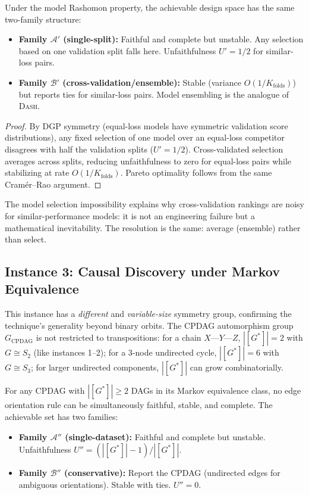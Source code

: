 \documentclass{jmlr}
\newcommand{\DASH}{\textsc{Dash}}
\begin{document}
\begin{theorem}
\label{thm:model-selection-ds}
Under the model Rashomon property, the achievable design space has the same two-family structure:
\begin{itemize}
    \item \textbf{Family $\mathcal{A}'$ (single-split):} Faithful and complete but unstable. Any selection based on one validation split falls here. Unfaithfulness $U' = 1/2$ for similar-loss pairs.
    \item \textbf{Family $\mathcal{B}'$ (cross-validation/ensemble):} Stable (variance $O(1/K_{\text{folds}})$) but reports ties for similar-loss pairs. Model ensembling is the analogue of \DASH{}.
\end{itemize}
\end{theorem}

\begin{proof}
By DGP symmetry (equal-loss models have symmetric validation score distributions), any fixed selection of one model over an equal-loss competitor disagrees with half the validation splits ($U' = 1/2$). Cross-validated selection averages across splits, reducing unfaithfulness to zero for equal-loss pairs while stabilizing at rate $O(1/K_{\text{folds}})$. Pareto optimality follows from the same Cram\'er--Rao argument.
\end{proof}

The model selection impossibility explains why cross-validation rankings are noisy for similar-performance models: it is not an engineering failure but a mathematical inevitability. The resolution is the same: average (ensemble) rather than select.

\subsection{Instance 3: Causal Discovery under Markov Equivalence}

This instance has a \emph{different} and \emph{variable-size} symmetry group, confirming the technique's generality beyond binary orbits. The CPDAG automorphism group $G_{\text{CPDAG}}$ is not restricted to transpositions: for a chain $X\text{---}Y\text{---}Z$, $|[G^*]| = 2$ with $G \cong S_2$ (like instances 1--2); for a 3-node undirected cycle, $|[G^*]| = 6$ with $G \cong S_3$; for larger undirected components, $|[G^*]|$ can grow combinatorially.

\begin{theorem}
\label{thm:causal-discovery}
For any CPDAG with $|[G^*]| \geq 2$ DAGs in its Markov equivalence class, no edge orientation rule can be simultaneously faithful, stable, and complete.
The achievable set has two families:
\begin{itemize}
    \item \textbf{Family $\mathcal{A}''$ (single-dataset):} Faithful and complete but unstable. Unfaithfulness $U'' = (|[G^*]|-1)/|[G^*]|$.
    \item \textbf{Family $\mathcal{B}''$ (conservative):} Report the CPDAG (undirected edges for ambiguous orientations). Stable with ties. $U'' = 0$.
\end{itemize}
\end{theorem}
\end{document}
